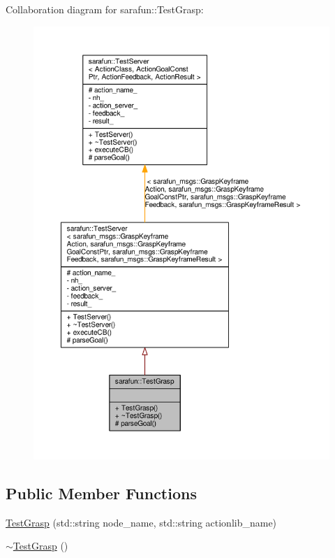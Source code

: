 Collaboration diagram for sarafun\-:\-:Test\-Grasp\-:\nopagebreak
\begin{figure}[H]
\begin{center}
\leavevmode
\includegraphics[width=350pt]{df/db8/classsarafun_1_1TestGrasp__coll__graph}
\end{center}
\end{figure}
\subsection*{Public Member Functions}
\begin{DoxyCompactItemize}
\item 
\hyperlink{classsarafun_1_1TestGrasp_a271a9845d2436b578a67b5be0b1ff3f3_a271a9845d2436b578a67b5be0b1ff3f3}{Test\-Grasp} (std\-::string node\-\_\-name, std\-::string actionlib\-\_\-name)
\item 
\hyperlink{classsarafun_1_1TestGrasp_ac49b5dffffedba55736264d9c321df22_ac49b5dffffedba55736264d9c321df22}{$\sim$\-Test\-Grasp} ()
\end{DoxyCompactItemize}
